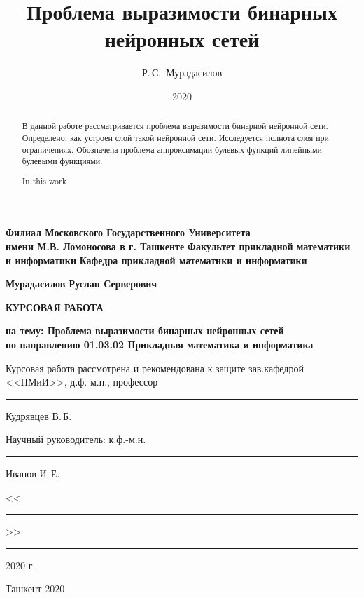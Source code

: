 \documentclass[a4paper, 14pt]{extarticle}
\title{Проблема выразимости бинарных нейронных сетей}
\author{Р.\,С.~Мурадасилов}
\date{2020}
\begin{document}
\begin{titlepage}
\begin{center}
        
\textbf{Филиал Московского Государственного Университета\\
имени М.В. Ломоносова в г. Ташкенте} \vskip 0.3cm
\textbf{Факультет прикладной математики и информатики} \vskip 0.3cm
\textbf{Кафедра прикладной математики и информатики} \vskip 3cm
            
\textbf{Мурадасилов Руслан Серверович} \vskip 1cm
            
\textbf{КУРСОВАЯ РАБОТА} \vskip 1cm
            
\normalsize { \textbf{на тему: \guillemotleft Проблема выразимости бинарных нейронных сетей\guillemotright \\ \vskip 0.5cm
по направлению 01.03.02 \guillemotleft Прикладная математика и информатика\guillemotright} }
\vskip 1.5cm
\end{center}

\begin{flushleft}
Курсовая работа рассмотрена и рекомендована к защите \vskip 5pt
зав.кафедрой <<ПМиИ>>, д.ф.-м.н., профессор \rule{2.365cm}{0.5pt} Кудрявцев В.\,Б.
\end{flushleft}
\begin{flushleft}
Научный руководитель:\vskip 5pt
к.ф.-м.н. \rule{10.798cm}{0.5pt} Иванов И.\,Е.
\end{flushleft}
          
\begin{flushright}
<<\rule{1cm}{0.5pt}>>\rule{3.5cm}{0.5pt} 2020 г.
\end{flushright}
        
\vfill   
\begin{center}
Ташкент 2020
\end{center}
\end{titlepage}


\begin{abstract}
    В данной работе рассматривается проблема выразимости бинарной нейронной сети. Определено, как устроен слой такой нейронной сети. Исследуется полнота слоя при ограничениях. Обозначена проблема аппроксимации булевых функций линейными булевыми функциями.
\end{abstract}

\begin{abstract}
In this work
\end{abstract}


\setcounter{page}{2}
\newpage
\tableofcontents
\newpage
\end{document}
